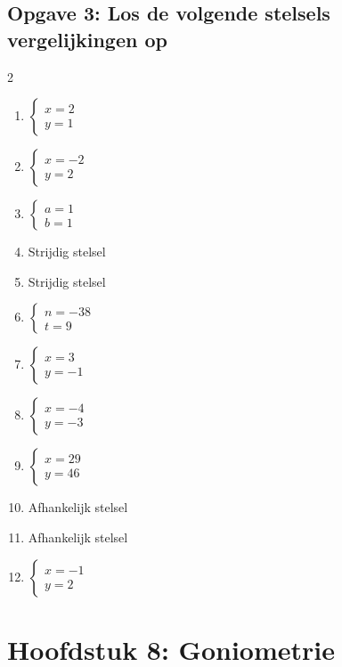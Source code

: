 \subsection*{Opgave 3: Los de volgende stelsels vergelijkingen op}
\begin{multicols}{2}
\begin{enumerate}[label=\alph*)]
    \item $\begin{cases} x = 2 \\ y = 1 \end{cases}$
    \item $\begin{cases} x = -2 \\ y = 2 \end{cases}$
    \item $\begin{cases} a = 1 \\ b = 1 \end{cases}$
    \item Strijdig stelsel
    \item Strijdig stelsel
    \item $\begin{cases} n = -38 \\ t = 9 \end{cases}$
    \item $\begin{cases} x = 3 \\ y = -1 \end{cases}$
    \item $\begin{cases} x = -4 \\ y = -3 \end{cases}$
    \item $\begin{cases} x = 29 \\ y = 46 \end{cases}$
    \item Afhankelijk stelsel
    \item Afhankelijk stelsel
    \item $\begin{cases} x = -1 \\ y = 2 \end{cases}$
\end{enumerate}
\end{multicols}



\newpage
\section{Hoofdstuk 8: Goniometrie}

